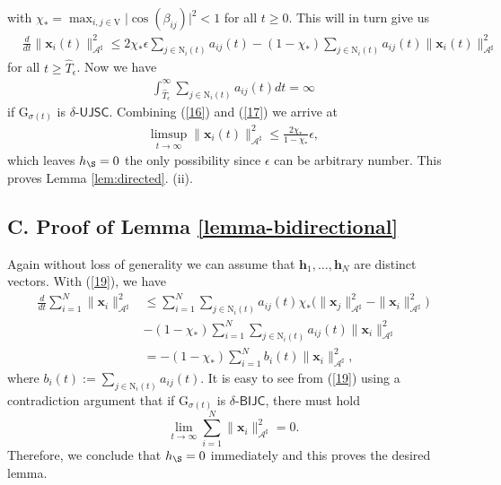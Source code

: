 \documentclass[a4paper, 11pt]{article}
\begin{document}
with $\chi_\ast=\max_{i,j\in\mathrm{V}}\big|\cos (\beta_{ij})\big|^2<1$
for all $t\geq 0$.
This will in turn give us
\begin{align}\label{16}
&\frac{d}{dt} \big \|\mathbf{x}_{i}(t)\big\|_{\mathcal{A}^\sharp}^2
\leq 2\chi_\ast \epsilon \sum_{j\in \mathrm{N}_i(t)}{a_{ij}(t)} -(1-\chi_\ast)  \sum_{j\in \mathrm{N}_i(t)}{a_{ij}(t)} \|\mathbf{x}_{i}(t)\big\|_{\mathcal{A}^\sharp}^2
\end{align}
for all $t\geq \hat{T}_\epsilon$. Now we have
\begin{align}\label{17}
\int_{\hat{T}_\epsilon}^\infty  \sum_{j\in \mathrm{N}_i(t)}{a_{ij}(t)}dt=\infty
\end{align}
if  $\mathrm{G}_{\sigma(t)}$ is $\delta$-$\mathsf{UJSC}$. Combining (\ref{16}) and (\ref{17}) we arrive at
\begin{align}
 \limsup_{t\to\infty}\big \|\mathbf{x}_{i}(t)\big\|_{\mathcal{A}^\sharp}^2\leq \frac{2\chi_\ast}{1-\chi_\ast} \epsilon,
\end{align}
which leaves $h_\S=0$ the only possibility since $\epsilon$ can be arbitrary number. This proves Lemma \ref{lem:directed}. (ii).

\subsection*{C. Proof of Lemma \ref{lemma-bidirectional}}
 Again without loss of generality we can assume that  $\mathbf{h}_1,\dots,\mathbf{h}_N$ are distinct vectors. With (\ref{19}), we have
\begin{align}\label{19}
\frac{d}{dt} \sum_{i=1}^N \big \|\mathbf{x}_{i}\big\|_{\mathcal{A}^\sharp}^2&\leq  \sum_{i=1}^N\sum_{j\in \mathrm{N}_i(t)}{a_{ij}(t)} \chi_\ast  \Big(\|\mathbf{x}_{j}\big\|_{\mathcal{A}^\sharp}^2 - \|\mathbf{x}_{i}\big\|_{\mathcal{A}^\sharp}^2 \Big)\nonumber\\
 &-(1-\chi_\ast)  \sum_{i=1}^N\sum_{j\in \mathrm{N}_i(t)}{a_{ij}(t)} \|\mathbf{x}_{i}\big\|_{\mathcal{A}^\sharp}^2\nonumber\\
&=-(1-\chi_\ast)  \sum_{i=1}^N b_i(t) \|\mathbf{x}_{i}\big\|_{\mathcal{A}^\sharp}^2,
\end{align}
where $b_i(t):=\sum_{j\in \mathrm{N}_i(t)}{a_{ij}(t)}$. It is easy  to see from (\ref{19}) using  a contradiction argument that if  $\mathrm{G}_{\sigma(t)}$ is $\delta$-$\mathsf{BIJC}$, there must hold
 $$
 \lim_{t\to\infty} \sum_{i=1}^N \big \|\mathbf{x}_{i}\big\|_{\mathcal{A}^\sharp}^2 =0.
 $$
 Therefore, we conclude that $h_\S=0$ immediately and this proves the desired lemma.
\end{document}
